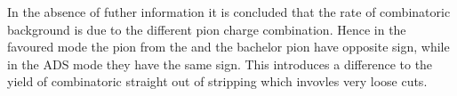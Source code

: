 In the absence of futher information it is concluded that the rate of combinatoric background is due to the different pion charge combination. Hence in the favoured mode the pion from the \D and the bachelor pion have opposite sign, while in the ADS mode they have the same sign. This introduces a difference to the yield of combinatoric straight out of stripping which invovles very loose cuts.


\clearpage
